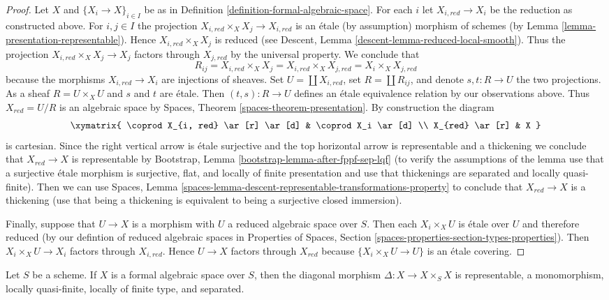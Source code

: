 \begin{proof}
\medskip\noindent
Let $X$ and $\{X_i \to X\}_{i \in I}$ be as in
Definition \ref{definition-formal-algebraic-space}.
For each $i$ let $X_{i, red} \to X_i$ be the reduction as
constructed above. For $i, j \in I$ the projection
$X_{i, red} \times_X X_j \to X_{i, red}$ is an \'etale (by assumption)
morphism of schemes (by Lemma \ref{lemma-presentation-representable}).
Hence $X_{i, red} \times_X X_j$ is reduced (see
Descent, Lemma \ref{descent-lemma-reduced-local-smooth}).
Thus the projection $X_{i, red} \times_X X_j \to X_j$ factors
through $X_{j, red}$ by the universal property. We conclude that
$$
R_{ij} = X_{i, red} \times_X X_j = X_{i, red} \times_X X_{j, red} =
X_i \times_X X_{j, red}
$$
because the morphisms $X_{i, red} \to X_i$ are injections of sheaves.
Set $U = \coprod X_{i, red}$, set
$R = \coprod R_{ij}$, and denote $s, t : R \to U$ the two
projections. As a sheaf $R = U \times_X U$ and $s$ and $t$
are \'etale. Then $(t, s) : R \to U$ defines an \'etale equivalence
relation by our observations above. Thus $X_{red} = U/R$ is an
algebraic space by Spaces, Theorem \ref{spaces-theorem-presentation}.
By construction the diagram
$$
\xymatrix{
\coprod X_{i, red} \ar[r] \ar[d] & \coprod X_i \ar[d] \\
X_{red} \ar[r] & X
}
$$
is cartesian. Since the right vertical arrow is \'etale surjective
and the top horizontal arrow is representable and a thickening
we conclude that $X_{red} \to X$ is representable by
Bootstrap, Lemma \ref{bootstrap-lemma-after-fppf-sep-lqf}
(to verify the assumptions of the lemma use that a surjective
\'etale morphism is surjective, flat, and locally of finite
presentation and use that thickenings are separated and locally quasi-finite).
Then we can use Spaces, Lemma
\ref{spaces-lemma-descent-representable-transformations-property}
to conclude that $X_{red} \to X$ is a thickening
(use that being a thickening is equivalent to being
a surjective closed immersion).

\medskip\noindent
Finally, suppose that $U \to X$ is a morphism with
$U$ a reduced algebraic space over $S$. Then each $X_i \times_X U$
is \'etale over $U$ and therefore reduced (by our defintion of
reduced algebraic spaces in Properties of Spaces, Section
\ref{spaces-properties-section-types-properties}).
Then $X_i \times_X U \to X_i$ factors through $X_{i, red}$.
Hence $U \to X$ factors through $X_{red}$ because
$\{X_i \times_X U \to U\}$ is an \'etale covering.
\end{proof}

\begin{lemma}
\label{lemma-diagonal-formal-algebraic-space}
Let $S$ be a scheme. If $X$ is a formal algebraic space over
$S$, then the diagonal morphism $\Delta : X \to X \times_S X$
is representable, a monomorphism, locally quasi-finite,
locally of finite type, and separated.
\end{lemma}

